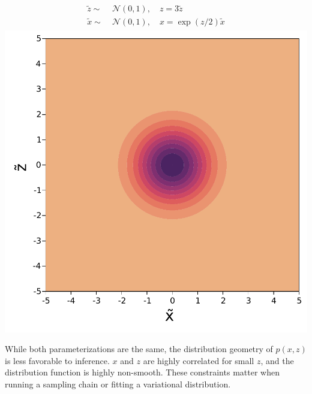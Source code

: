 \begin{minipage}{0.5\textwidth}
    \centering
    \begin{align}
        \begin{aligned}
            \tilde{z} \sim&\; \mathcal{N}(0, 1),\quad z = 3\tilde{z}\\
            \tilde{x} \sim&\; \mathcal{N}(0, 1),\quad x = \exp(z/2)\tilde{x}
        \end{aligned}
    \end{align}
    \includegraphics[width=\textwidth]{./chapters/1_introduction/figures/neals_funnel_non_centered.pdf}
    \label{fig:neals_noncentered}
\end{minipage}
\vspace{0.5cm}

While both parameterizations are the same, the distribution geometry of $p(x,z)$ is less favorable to inference.
$x$ and $z$ are highly correlated for small $z$, and the distribution function is highly non-smooth.
These constraints matter when running a sampling chain or fitting a variational distribution.

